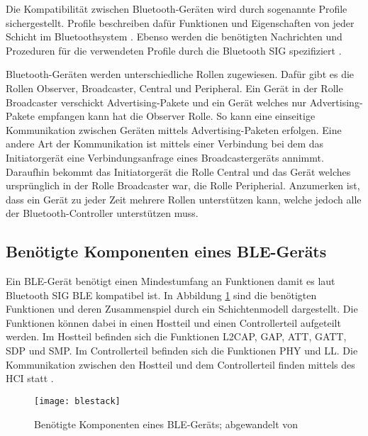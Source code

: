 Die Kompatibilität zwischen Bluetooth-Geräten wird durch sogenannte Profile sichergestellt. Profile beschreiben dafür Funktionen und Eigenschaften von jeder Schicht im Bluetoothsystem \cite[S.~277]{bluetoothCore}. Ebenso werden die benötigten Nachrichten und Prozeduren für die verwendeten Profile durch die Bluetooth \ac{SIG} spezifiziert \cite[S.~1241]{bluetoothCore}.

Bluetooth-Geräten werden unterschiedliche Rollen zugewiesen. Dafür gibt es die Rollen Observer, Broadcaster, Central und Peripheral. Ein Gerät in der Rolle Broadcaster verschickt Advertising-Pakete und ein Gerät welches nur Advertising-Pakete empfangen kann hat die Observer Rolle. So kann eine einseitige Kommunikation zwischen Geräten mittels Advertising-Paketen erfolgen. Eine andere Art der Kommunikation ist mittels einer Verbindung bei dem das Initiatorgerät eine Verbindungsanfrage eines Broadcastergeräts annimmt. Daraufhin bekommt das Initiatorgerät die Rolle Central und das Gerät welches ursprünglich in der Rolle Broadcaster war, die Rolle Peripherial. Anzumerken ist, dass ein Gerät zu jeder Zeit mehrere Rollen unterstützen kann, welche jedoch alle der Bluetooth-Controller unterstützen muss. \cite[S.~190f., S.~278, S.~1246ff.]{bluetoothCore}

\subsection{Benötigte Komponenten eines \ac{BLE}-Geräts}

Ein \ac{BLE}-Gerät benötigt einen Mindestumfang an Funktionen damit es laut Bluetooth \ac{SIG} \ac{BLE} kompatibel ist. In Abbildung \ref{fig:blestack} sind die benötigten Funktionen und deren Zusammenspiel durch ein Schichtenmodell dargestellt. Die Funktionen können dabei in einen Hostteil und einen Controllerteil aufgeteilt werden. Im Hostteil befinden sich die Funktionen \ac{L2CAP}, \ac{GAP}, \ac{ATT}, \ac{GATT}, \ac{SDP} und \ac{SMP}. Im Controllerteil befinden sich die Funktionen \ac{PHY} und \ac{LL}. Die Kommunikation zwischen den Hostteil und dem Controllerteil finden mittels des \ac{HCI} statt \cite[S.~1735]{bluetoothCore}. \cite[S.~193]{bluetoothCore}

\begin{figure}[h]
    \centering
    \texttt{[image: blestack]}
    \caption{Benötigte Komponenten eines \acs{BLE}-Geräts; abgewandelt von \cite[S.~203, S.~1245]{bluetoothCore}}
    \label{fig:blestack}
\end{figure}

